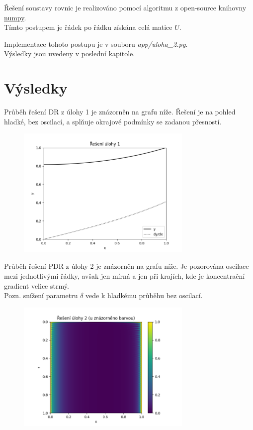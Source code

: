 \documentclass[a4paper,12pt]{article}
\begin{document}
Řešení soustavy rovnic je realizováno pomocí algoritmu z open-source knihovny \textcolor{blue}{\underline{\href{https://numpy.org/}{numpy}}}.\\
Tímto postupem je řádek po řádku získána celá matice $U$.

Implementace tohoto postupu je v souboru \textit{app/uloha\_2.py}. \\
Výsledky jsou uvedeny v poslední kapitole.



\newpage
\section*{Výsledky}
Průběh řešení DR z úlohy 1 je znázorněn na grafu níže.
Řešení je na pohled hladké, bez oscilací, a splňuje okrajové podmínky se zadanou přesností.
\begin{figure}[H]
\begin{center}
	\includegraphics[width=0.75\textwidth]{uloha_1.png}
\end{center}
\end{figure}

Průběh řešení PDR z úlohy 2 je znázorněn na grafu níže.
Je pozorována oscilace mezi jednotlivými řádky, avšak jen mírná a jen při krajích, kde je koncentrační gradient velice strmý. \\
Pozn. snížení parametru $\delta$ vede k hladkému průběhu bez oscilací.
\begin{figure}[H]
\begin{center}
	\includegraphics[width=0.75\textwidth]{uloha_2.png}
\end{center}
\end{figure}
\end{document}
